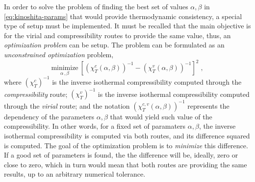 In order to solve the problem of finding the best set of values \(\alpha, \beta\) in 
\autoref{eq:kinoshita-params} that would provide thermodynamic consistency, a special type 
of setup must be implemented. It must be recalled that the main objective is for the virial 
and compressibility routes to provide the same value, thus, an \emph{optimization problem} 
can be setup. The problem can be formulated as an \emph{unconstrained optimization} problem,
\begin{equation}
    \underset{\alpha \, , \beta}{\text{minimize}} \: {\left[
        {\left(\chi_{T}^{c} \left(\alpha, \beta\right) \right)}^{-1} - {\left(\chi_{T}^{v} \left(\alpha, \beta\right) \right)}^{-1} \right]}^2
    \; ,
    \label{eq:optimiziation-chi}
\end{equation}
where \({\left(\chi_{T}^{c}\right)}^{-1}\) is the inverse isothermal compressibility 
computed through the \emph{compressibility} route; \({\left(\chi_{T}^{v}\right)}^{-1}\) is 
the inverse isothermal compressibility computed through the \emph{virial} route; and the 
notation \({\left(\chi_{T}^{c, v} \left(\alpha, \beta\right) \right)}^{-1}\) represents the 
dependency of the parameters \(\alpha, \beta\) that would yield such value of the 
compressibility. In other words, for a fixed set of paramaters \(\alpha, \beta\), the 
inverse isothermal compressibility is computed via both routes, and its difference squared 
is computed. The goal of the optimization problem is to \emph{minimize} this difference. If 
a good set of parameters is found, the the difference will be, ideally, zero or close to 
zero, which in turn would mean that both routes are providing the same results, up to an 
arbitrary numerical tolerance.

